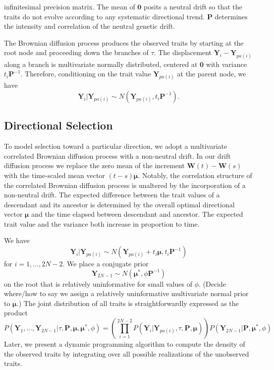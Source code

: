 \documentclass[12pt]{article}
\begin{document}
infinitesimal precision matrix.  The mean of $\textbf{0}$ posits a neutral drift so that the traits do not evolve according to any systematic directional
trend.  $\textbf{P}$ determines the intensity and correlation of the neutral genetic drift.
\par
The Brownian diffusion process produces the observed traits by starting at the root node and proceeding down the branches of $\tau$.  The
displacement $\textbf{Y}_i - \textbf{Y}_{pa(i)}$ along a branch is multivariate normally distributed, centered at $\textbf{0}$ with variance $t_i \textbf{P}^{-1}$.  Therefore,
conditioning on the trait value $\textbf{Y}_{pa(i)}$ at the parent node, we have
\begin{equation}
\textbf{Y}_{i} | \textbf{Y}_{pa(i)} \sim N \left(\textbf{Y}_{pa(i)}, t_i \textbf{P}^{-1} \right) .
\end{equation}


\subsection{Directional Selection}

To model selection toward a particular direction, we adopt a multivariate correlated Brownian diffusion process with a non-neutral drift.  
In our drift diffusion process we replace the zero mean of the increment $\textbf{W}(t) - \textbf{W}(s)$ with the time-scaled mean
vector $(t-s)\boldsymbol \mu$.  Notably, the correlation structure of the correlated Brownian diffusion process is unaltered by the incorporation of a
non-neutral drift.
The expected difference between the trait values of a descendant and its ancestor is determined 
by the overall optimal directional vector $\boldsymbol \mu$ and the time elapsed between descendant and ancestor.  
The expected trait value and the variance both increase in proportion to time.
\par
We have
\begin{equation}
\textbf{Y}_i | \textbf{Y}_{pa(i)} \sim N \left( \textbf{Y}_{pa(i)} + t_i \boldsymbol \mu, t_i \textbf{P}^{-1} \right)
\end{equation}
for $i = 1, \dots, 2N-2$.  We place a conjugate prior 
\begin{equation}
\textbf{Y}_{2N-1} \sim N \left(\boldsymbol \mu^*, \phi \textbf{P}^{-1} \right)
\end{equation}
on the root that is relatively uninformative for small values of $\phi$.  (Decide where/how to say we assign a relatively uninformative multivariate 
normal prior to $\boldsymbol \mu$.)  The joint distribution of all traits is straightforwardly expressed as the product
\begin{equation}
P(\textbf{Y}_1,\dots,\textbf{Y}_{2N-1} | \tau, \textbf{P}, \boldsymbol \mu, \boldsymbol \mu^*, \phi) = \left( \prod_{i=1}^{2N-2} P(\textbf{Y}_i|\textbf{Y}_{pa(i)},\tau, \textbf{P},\boldsymbol \mu) \right) P(\textbf{Y}_{2N-1} | \textbf{P},\boldsymbol \mu^*, \phi)
\end{equation}
Later, we present a dynamic programming algorithm to compute the density of the observed traits by integrating over all possible realizations of the
unobserved traits.
\end{document}
